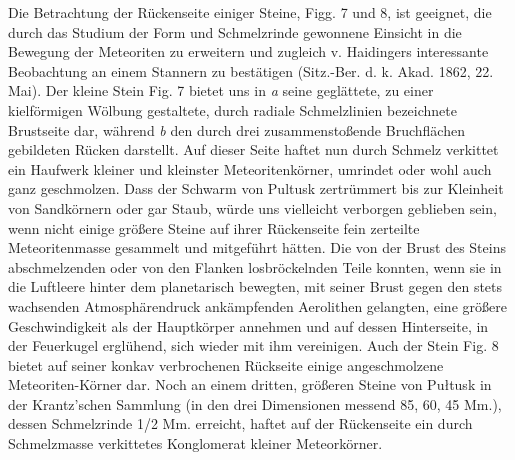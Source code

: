\documentclass[a4paper, 11pt, oneside, german]{article}
\begin{document}
Die Betrachtung der Rückenseite einiger Steine, Figg. 7 und 8, ist geeignet, die durch das Studium der Form und Schmelzrinde gewonnene Einsicht in die Bewegung der Meteoriten zu erweitern und zugleich v. Haidingers interessante Beobachtung an einem Stannern zu bestätigen (Sitz.-Ber. d. k. Akad. 1862, 22. Mai). Der kleine Stein Fig. 7 bietet uns in \emph{a} seine geglättete, zu einer kielförmigen Wölbung gestaltete, durch radiale Schmelzlinien bezeichnete Brustseite dar, während \emph{b} den durch drei zusammenstoßende Bruchflächen gebildeten Rücken darstellt. Auf dieser Seite haftet nun durch Schmelz verkittet ein Haufwerk kleiner und kleinster Meteoritenkörner, umrindet oder wohl auch ganz geschmolzen. Dass der Schwarm von Pultusk zertrümmert bis zur Kleinheit von Sandkörnern oder gar Staub, würde uns vielleicht verborgen geblieben sein, wenn nicht einige größere Steine auf ihrer Rückenseite fein zerteilte Meteoritenmasse gesammelt und mitgeführt hätten. Die von der Brust des Steins abschmelzenden oder von den Flanken losbröckelnden Teile konnten, wenn sie in die Luftleere hinter dem planetarisch bewegten, mit seiner Brust gegen den stets wachsenden Atmosphärendruck ankämpfenden Aerolithen gelangten, eine größere Geschwindigkeit als der Hauptkörper annehmen und auf dessen Hinterseite, in der Feuerkugel erglühend, sich wieder mit ihm vereinigen. Auch der Stein Fig. 8 bietet auf seiner konkav verbrochenen Rückseite einige angeschmolzene Meteoriten-Körner dar. Noch an einem dritten, größeren Steine von Pułtusk in der Krantz'schen Sammlung (in den drei Dimensionen messend 85, 60, 45 Mm.), dessen Schmelzrinde 1/2 Mm. erreicht, haftet auf der Rückenseite ein durch Schmelzmasse verkittetes Konglomerat kleiner Meteorkörner.
\end{document}
